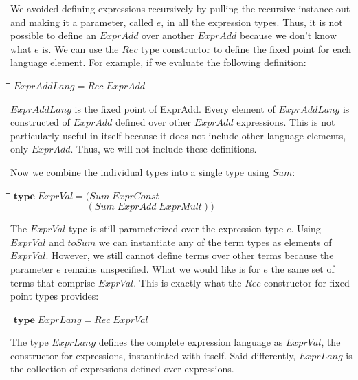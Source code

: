 \documentclass[11pt]{article}
\newlength{\lwidth}\setlength{\lwidth}{4.5cm}
\newlength{\cwidth}\setlength{\cwidth}{8mm} %
\newcommand{\Conid}[1]{\mathit{#1}}
\newcommand{\Varid}[1]{\mathit{#1}}
\begin{document}
We avoided defining expressions recursively by pulling the recursive
instance out and making it a parameter, called \ensuremath{\Varid{e}}, in all the
expression types.  Thus, it is not possible to define an \ensuremath{\Conid{ExprAdd}}
over another \ensuremath{\Conid{ExprAdd}} because we don't know what \ensuremath{\Varid{e}} is.  We can use
the \ensuremath{\Conid{Rec}} type constructor to define the fixed point for each language
element.  For example, if we evaluate the following definition:

\begin{tabbing}
\qquad\=\hspace{\lwidth}\=\hspace{\cwidth}\=\+\kill
${\Conid{ExprAddLang}\mathrel{=}\Conid{Rec}\;\Conid{ExprAdd}}$
\end{tabbing}
\ensuremath{\Conid{ExprAddLang}} is the fixed point of ExprAdd.  Every element of
\ensuremath{\Conid{ExprAddLang}} is constructed of \ensuremath{\Conid{ExprAdd}} defined over other \ensuremath{\Conid{ExprAdd}}
expressions.  This is not particularly useful in itself because it
does not include other language elements, only \ensuremath{\Conid{ExprAdd}}.  Thus, we
will not include these definitions.

Now we combine the individual types into a single type using \ensuremath{\Conid{Sum}}:

\begin{tabbing}
\qquad\=\hspace{\lwidth}\=\hspace{\cwidth}\=\+\kill
${\mathbf{type}\;\Conid{ExprVal}\mathrel{=}(\Conid{Sum}\;\Conid{ExprConst}}$\\
${\phantom{\mathbf{type}\;\Conid{ExprVal}\mathrel{=}(\mbox{}}(\Conid{Sum}\;\Conid{ExprAdd}\;\Conid{ExprMult}))}$
\end{tabbing}
The \ensuremath{\Conid{ExprVal}} type is still parameterized over the expression type
\ensuremath{\Varid{e}}.  Using \ensuremath{\Conid{ExprVal}} and \ensuremath{\Varid{toSum}} we can instantiate any of the term
types as elements of \ensuremath{\Conid{ExprVal}}.  However, we still cannot define terms
over other terms because the parameter \ensuremath{\Varid{e}} remains unspecified.  What
we would like is for \ensuremath{\Varid{e}} the same set of terms that comprise
\ensuremath{\Conid{ExprVal}}.  This is exactly what the \ensuremath{\Conid{Rec}} constructor for fixed point
types provides:

\begin{tabbing}
\qquad\=\hspace{\lwidth}\=\hspace{\cwidth}\=\+\kill
${\mathbf{type}\;\Conid{ExprLang}\mathrel{=}\Conid{Rec}\;\Conid{ExprVal}}$
\end{tabbing}
The type \ensuremath{\Conid{ExprLang}} defines the complete expression language as
\ensuremath{\Conid{ExprVal}}, the constructor for expressions, instantiated with itself.
Said differently, \ensuremath{\Conid{ExprLang}} is the collection of expressions defined
over expressions.
\end{document}
